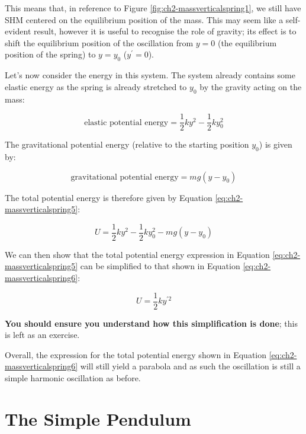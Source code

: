 \documentclass[
]{book}
\begin{document}
This means that, in reference to Figure \ref{fig:ch2-massverticalspring1}, we still have SHM centered on the equilibrium position of the mass. This may seem like a self-evident result, however it is useful to recognise the role of gravity; its effect is to shift the equilibrium position of the oscillation from \(y = 0\) (the equilibrium position of the spring) to \(y = y_0\) (\(y^\prime = 0\)).

Let's now consider the energy in this system. The system already contains some elastic energy as the spring is already stretched to \(y_0\) by the gravity acting on the mass:

\begin{equation}
\textrm{elastic potential energy} = \frac{1}{2}ky^2 - \frac{1}{2}ky_0^2
\end{equation}

The gravitational potential energy (relative to the starting position \(y_0\)) is given by:

\begin{equation}
\textrm{gravitational potential energy} = mg(y-y_0)
\end{equation}

The total potential energy is therefore given by Equation \eqref{eq:ch2-massverticalspring5}:

\begin{equation}
U = \frac{1}{2}ky^2 - \frac{1}{2}ky_0^2 - mg(y-y_0)
\label{eq:ch2-massverticalspring5}
\end{equation}

We can then show that the total potential energy expression in Equation \eqref{eq:ch2-massverticalspring5} can be simplified to that shown in Equation \eqref{eq:ch2-massverticalspring6}:

\begin{equation}
U = \frac{1}{2} ky^{\prime 2}
\label{eq:ch2-massverticalspring6}
\end{equation}

\textbf{You should ensure you understand how this simplification is done}; this is left as an exercise.

Overall, the expression for the total potential energy shown in Equation \eqref{eq:ch2-massverticalspring6} will still yield a parabola and as such the oscillation is still a simple harmonic oscillation as before.

\hypertarget{sec:ch2-simplependulum}{%
\section{The Simple Pendulum}\label{sec:ch2-simplependulum}}
\end{document}
